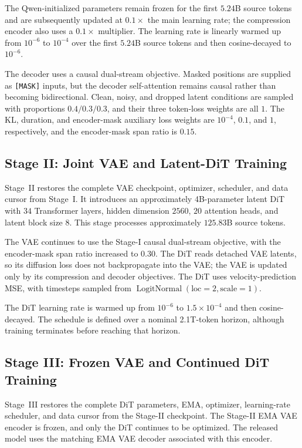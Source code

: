 The Qwen-initialized parameters remain frozen for the first $5.24$B source tokens and are subsequently updated at $0.1\times$ the main learning rate; the compression encoder also uses a $0.1\times$ multiplier. The learning rate is linearly warmed up from $10^{-6}$ to $10^{-4}$ over the first $5.24$B source tokens and then cosine-decayed to $10^{-6}$.

The decoder uses a causal dual-stream objective. Masked positions are supplied as \texttt{[MASK]} inputs, but the decoder self-attention remains causal rather than becoming bidirectional. Clean, noisy, and dropped latent conditions are sampled with proportions $0.4/0.3/0.3$, and their three token-loss weights are all $1$. The KL, duration, and encoder-mask auxiliary loss weights are $10^{-4}$, $0.1$, and $1$, respectively, and the encoder-mask span ratio is $0.15$.

\subsection{Stage II: Joint VAE and Latent-DiT Training}

Stage~II restores the complete VAE checkpoint, optimizer, scheduler, and data cursor from Stage~I. It introduces an approximately 4B-parameter latent DiT with $34$ Transformer layers, hidden dimension $2560$, $20$ attention heads, and latent block size $8$. This stage processes approximately $125.83$B source tokens.

The VAE continues to use the Stage-I causal dual-stream objective, with the encoder-mask span ratio increased to $0.30$. The DiT reads detached VAE latents, so its diffusion loss does not backpropagate into the VAE; the VAE is updated only by its compression and decoder objectives. The DiT uses velocity-prediction MSE, with timesteps sampled from $\operatorname{LogitNormal}(\mathrm{loc}=2,\mathrm{scale}=1)$.

The DiT learning rate is warmed up from $10^{-6}$ to $1.5\times10^{-4}$ and then cosine-decayed. The schedule is defined over a nominal 2.1T-token horizon, although training terminates before reaching that horizon.

\subsection{Stage III: Frozen VAE and Continued DiT Training}

Stage~III restores the complete DiT parameters, EMA, optimizer, learning-rate scheduler, and data cursor from the Stage-II checkpoint. The Stage-II EMA VAE encoder is frozen, and only the DiT continues to be optimized. The released model uses the matching EMA VAE decoder associated with this encoder.

